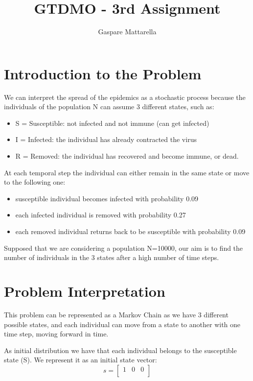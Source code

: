 \documentclass[10pt]{article}
\title{\textbf{GTDMO - 3rd Assignment}}
\author{Gaspare Mattarella}
\theoremstyle{plain}
\theoremstyle{definition}
\begin{document}
\maketitle 

\section{Introduction to the Problem}

We can interpret the spread of the epidemics as a stochastic process because the individuals of the population N can assume 3 different states, such as: 
\begin{itemize}

\item  S = Susceptible: not infected and not immune (can get infected) 
\item  I = Infected: the individual has already contracted the virus  
\item  R = Removed: the individual has recovered and become immune, or dead. 
\end{itemize}

At each temporal step the individual can either remain in the same state or move to the following one: 
\begin{itemize}
    \item susceptible individual becomes infected with probability 0.09  
    \item each infected individual is removed with probability 0.27
    \item each removed individual returns back to be susceptible with probability 0.09
\end{itemize}

Supposed that we are considering a population N=10000, our aim is to find the number of individuals in the 3 states after a high number of time steps. 

\section{Problem Interpretation}
This problem can be represented as a Markov Chain as we have 3 different possible states, and each individual can move from a state to another with one time step, moving forward in time.  

As initial distribution we have that each individual belongs to the susceptible state (S). We represent it as an initial state vector: 
\begin{equation}
\textit{s} = \begin{bmatrix}
1 & 0 & 0 \\
\end{bmatrix}
\end{equation}
\\
\end{document}
